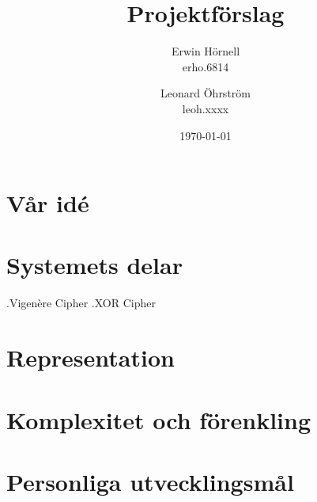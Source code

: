 \documentclass[a4paper,12pt]{article}
\title{Projektförslag}
\author{
Erwin Hörnell \\
erho.6814
\and
Leonard Öhrström \\
leoh.xxxx
}
\date{\today}
\begin{document}
\maketitle
\newpage
\section{Vår idé}
\section{Systemets delar}
.Vigenère Cipher
.XOR Cipher
\section{Representation}
\section{Komplexitet och förenkling}
\section{Personliga utvecklingsmål}
\end{document}
